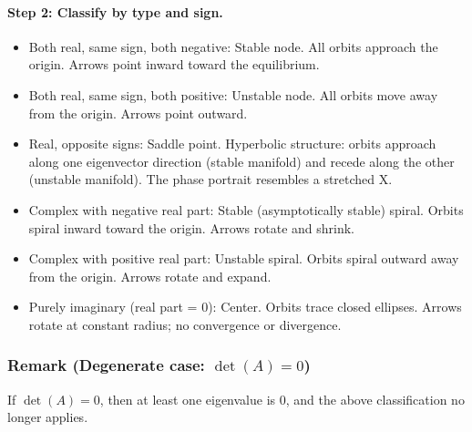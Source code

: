 \documentclass{article}
\begin{document}
\paragraph{Step 2: Classify by type and sign.}
\begin{itemize}
    \item Both real, same sign, both negative: Stable node. All orbits approach the origin. Arrows point inward toward the equilibrium.
    
    \item Both real, same sign, both positive: Unstable node. All orbits move away from the origin. Arrows point outward.
    
    \item Real, opposite signs: Saddle point. Hyperbolic structure: orbits approach along one eigenvector direction (stable manifold) and recede along the other (unstable manifold). The phase portrait resembles a stretched X.
    
    \item Complex with negative real part: Stable (asymptotically stable) spiral. Orbits spiral inward toward the origin. Arrows rotate and shrink.
    
    \item Complex with positive real part: Unstable spiral. Orbits spiral outward away from the origin. Arrows rotate and expand.
    
    \item Purely imaginary (real part = 0): Center. Orbits trace closed ellipses. Arrows rotate at constant radius; no convergence or divergence.
\end{itemize}
\subsubsection*{Remark (Degenerate case: $\det(A) = 0$)}
If $\det(A) = 0$, then at least one eigenvalue is $0$, and the above classification no longer applies.
\end{document}
